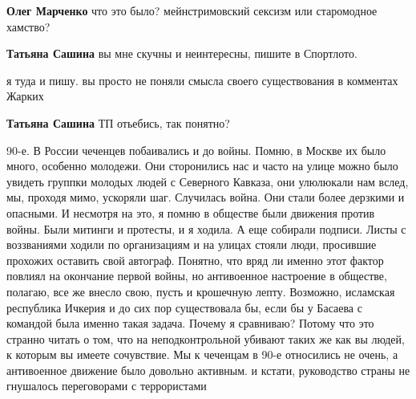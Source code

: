 \begin{itemize}
\begin{itemize}
\textbf{Олег Марченко} что это было? мейнстримовский сексизм или старомодное хамство?

 
\textbf{Татьяна Сашина} вы мне скучны и неинтересны, пишите в Спортлото.

 
я туда и пишу. вы просто не поняли смысла своего существования в комментах Жарких

 
\textbf{Татьяна Сашина} ТП отьебись, так понятно?

\end{itemize}

 

90-е. В России чеченцев побаивались и до войны. Помню, в Москве их было много,
особенно молодежи. Они сторонились нас и часто на улице можно было увидеть
группки молодых людей с Северного Кавказа, они улюлюкали нам вслед, мы, проходя
мимо, ускоряли шаг. Случилась война. Они стали более дерзкими и опасными. И
несмотря на это, я помню в обществе были движения против войны. Были митинги и
протесты, и я ходила. А еще собирали подписи. Листы с воззваниями ходили по
организациям и на улицах стояли люди, просившие прохожих оставить свой
автограф. Понятно, что вряд ли именно этот фактор повлиял на окончание первой
войны, но антивоенное настроение в обществе, полагаю, все же внесло свою, пусть
и крошечную лепту. Возможно, исламская республика Ичкерия и до сих пор
существовала бы, если бы у Басаева с командой была именно такая задача. Почему
я сравниваю? Потому что это странно читать о том, что на неподконтрольной
убивают таких же как вы людей, к которым вы имеете сочувствие. Мы к чеченцам в
90-е относились не очень, а антивоенное движение было довольно активным. и
кстати, руководство страны не гнушалось переговорами с террористами


\end{itemize}
